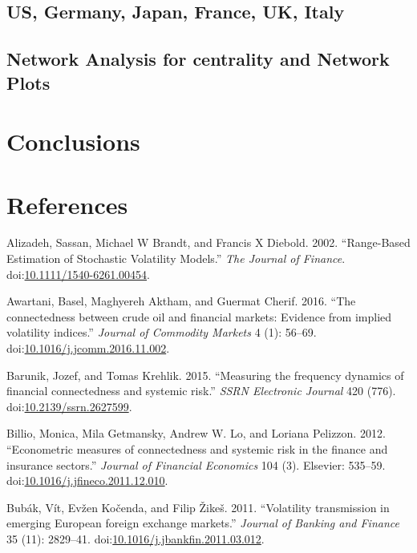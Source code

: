\documentclass[]{elsarticle} %
\begin{document}
\subsection{US, Germany, Japan, France, UK,
Italy}\label{us-germany-japan-france-uk-italy}

\subsection{Network Analysis for centrality and Network
Plots}\label{network-analysis-for-centrality-and-network-plots}

\section{Conclusions}\label{conclusions}

\section*{References}\label{references}

\hypertarget{refs}{}
\hypertarget{ref-Alizadeh2002}{}
Alizadeh, Sassan, Michael W Brandt, and Francis X Diebold. 2002.
``Range-Based Estimation of Stochastic Volatility Models.'' \emph{The
Journal of Finance}.
doi:\href{https://doi.org/10.1111/1540-6261.00454}{10.1111/1540-6261.00454}.

\hypertarget{ref-Awartani2016}{}
Awartani, Basel, Maghyereh Aktham, and Guermat Cherif. 2016. ``The
connectedness between crude oil and financial markets: Evidence from
implied volatility indices.'' \emph{Journal of Commodity Markets} 4 (1):
56--69.
doi:\href{https://doi.org/10.1016/j.jcomm.2016.11.002}{10.1016/j.jcomm.2016.11.002}.

\hypertarget{ref-Barunik2015}{}
Barunik, Jozef, and Tomas Krehlik. 2015. ``Measuring the frequency
dynamics of financial connectedness and systemic risk.'' \emph{SSRN
Electronic Journal} 420 (776).
doi:\href{https://doi.org/10.2139/ssrn.2627599}{10.2139/ssrn.2627599}.

\hypertarget{ref-Billio2012}{}
Billio, Monica, Mila Getmansky, Andrew W. Lo, and Loriana Pelizzon.
2012. ``Econometric measures of connectedness and systemic risk in the
finance and insurance sectors.'' \emph{Journal of Financial Economics}
104 (3). Elsevier: 535--59.
doi:\href{https://doi.org/10.1016/j.jfineco.2011.12.010}{10.1016/j.jfineco.2011.12.010}.

\hypertarget{ref-Bubak2011}{}
Bubák, Vít, Evžen Kočenda, and Filip Žikeš. 2011. ``Volatility
transmission in emerging European foreign exchange markets.''
\emph{Journal of Banking and Finance} 35 (11): 2829--41.
doi:\href{https://doi.org/10.1016/j.jbankfin.2011.03.012}{10.1016/j.jbankfin.2011.03.012}.
\end{document}
